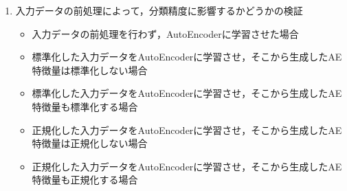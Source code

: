 \begin{enumerate}
    \item 入力データの前処理によって，分類精度に影響するかどうかの検証
    \begin{itemize}
        \item 入力データの前処理を行わず，AutoEncoderに学習させた場合
        \item 標準化した入力データをAutoEncoderに学習させ，そこから生成したAE特徴量は標準化しない場合
        \item 標準化した入力データをAutoEncoderに学習させ，そこから生成したAE特徴量も標準化する場合
        \item 正規化した入力データをAutoEncoderに学習させ，そこから生成したAE特徴量は正規化しない場合
        \item 正規化した入力データをAutoEncoderに学習させ，そこから生成したAE特徴量も正規化する場合
    \end{itemize}

    

\end{enumerate}